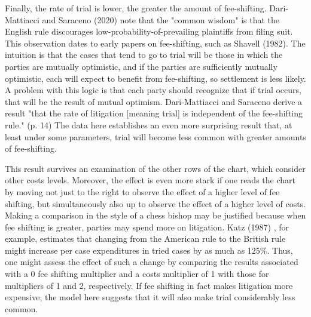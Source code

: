 \documentclass{article}
\begin{document}
Finally, the rate of trial is lower, the greater the amount of fee-shifting. Dari-Mattiacci and Saraceno (2020) note that the "common wisdom" is that the English rule discourages low-probability-of-prevailing plaintiffs from filing suit. This observation dates to early papers on fee-shifting, such as Shavell (1982). The intuition is that the cases that tend to go to trial will be those in which the parties are mutually optimistic, and if the parties are sufficiently mutually optimistic, each will expect to benefit from fee-shifting, so settlement is less likely. A problem with this logic is that each party should recognize that if trial occurs, that will be the result of mutual optimism. Dari-Mattiacci and Saraceno derive a result "that the rate of litigation [meaning trial] is independent of the fee-shifting rule." (p. 14) The data here establishes an even more surprising result that, at least under some parameters, trial will become less common with greater amounts of fee-shifting.

This result survives an examination of the other rows of the chart, which consider other costs levels. Moreover, the effect is even more stark if one reads the chart by moving not just to the right to observe the effect of a higher level of fee shifting, but simultaneously also up to observe the effect of a higher level of costs. Making a comparison in the style of a chess bishop may be justified because when fee shifting is greater, parties may spend more on litigation. Katz (1987) \cite{katz}, for example, estimates that changing from the American rule to the British rule might increase per case expenditures in tried cases by as much as 125\%. Thus, one might assess the effect of such a change by comparing the results associated with a 0 fee shifting multiplier and a costs multiplier of 1 with those for multipliers of 1 and 2, respectively. If fee shifting in fact makes litigation more expensive, the model here suggests that it will also make trial considerably less common.
\end{document}
